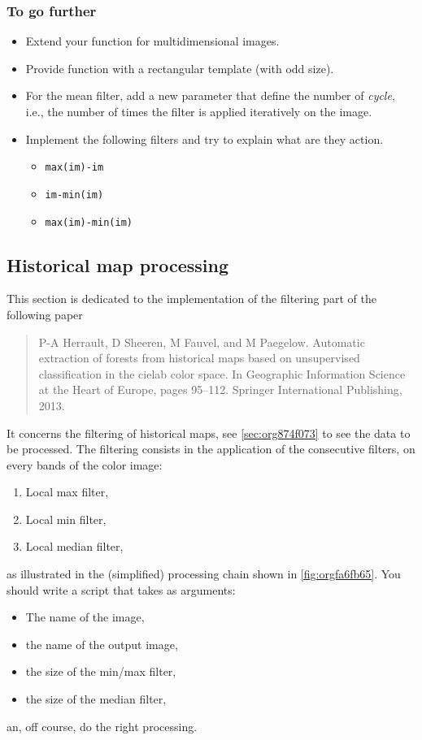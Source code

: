 \documentclass[a4paper,11pt,DIV=18]{scrartcl}
\begin{document}
\subsubsection{To go further}
\label{sec:orgab35e74}
\begin{itemize}
\item Extend your function for multidimensional images.
\item Provide function with a rectangular template (with odd size).
\item For the mean filter, add a new parameter that define the number of
\emph{cycle}, i.e., the number of times the filter is applied iteratively
on the image.
\item Implement the  following filters  and try to  explain what  are they
action.
\begin{itemize}
\item \texttt{max(im)-im}
\item \texttt{im-min(im)}
\item \texttt{max(im)-min(im)}
\end{itemize}
\end{itemize}
\subsection{Historical map processing}
\label{sec:orgd9cc02a}
This section is dedicated to the implementation of the filtering part of the following paper
\begin{quote}
P-A  Herrault,  D  Sheeren,  M   Fauvel,  and  M  Paegelow.  Automatic
extraction  of  forests from  historical  maps  based on  unsupervised
classification in  the cielab  color space. In  Geographic Information
Science at the Heart of  Europe, pages 95--112. Springer International
Publishing, 2013.
\end{quote}

It concerns the filtering of  historical maps, see \ref{sec:org874f073} to see
the data to be processed. The filtering consists in the application of
the consecutive filters, on every bands of the color image:
\begin{enumerate}
\item Local max filter,
\item Local min filter,
\item Local median filter,
\end{enumerate}
as  illustrated   in  the  (simplified)  processing   chain  shown  in
\ref{fig:orgfa6fb65}. You should write a script that takes as arguments:
\begin{itemize}
\item The name of the image,
\item the name of the output image,
\item the size of the min/max filter,
\item the size of the median filter,
\end{itemize}
an, off course, do the right processing.
\end{document}
